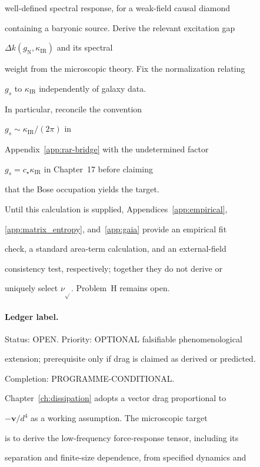 well-defined spectral response, for a weak-field causal diamond

containing a baryonic source. Derive the relevant excitation gap

\(\Delta k(g_{\mathrm N},\kappa_{\mathrm{IR}})\) and its spectral

weight from the microscopic theory. Fix the normalization relating

\(g_s\) to \(\kappa_{\mathrm{IR}}\) independently of galaxy data.

In particular, reconcile the convention

\(g_s\sim\kappa_{\mathrm{IR}}/(2\pi)\) in

Appendix~\ref{app:rar-bridge} with the undetermined factor

\(g_s=c_\star\kappa_{\mathrm{IR}}\) in Chapter~17 before claiming

that the Bose occupation yields the target.



Until this calculation is supplied, Appendices~\ref{app:empirical},

\ref{app:matrix_entropy}, and~\ref{app:gaia} provide an empirical fit

check, a standard area-term calculation, and an external-field

consistency test, respectively; together they do not derive or

uniquely select \(\nu_{\sqrt{}}\). Problem~H remains open.





\paragraph{Ledger label.} \label{detail:sec-H-paragraphledgerlabel-41}

Status: OPEN. Priority: OPTIONAL falsifiable phenomenological

extension; prerequisite only if drag is claimed as derived or predicted.

Completion: PROGRAMME-CONDITIONAL.



Chapter~\ref{ch:dissipation} adopts a vector drag proportional to

\(-\mathbf v/d^4\) as a working assumption. The microscopic target

is to derive the low-frequency force-response tensor, including its

separation and finite-size dependence, from specified dynamics and

